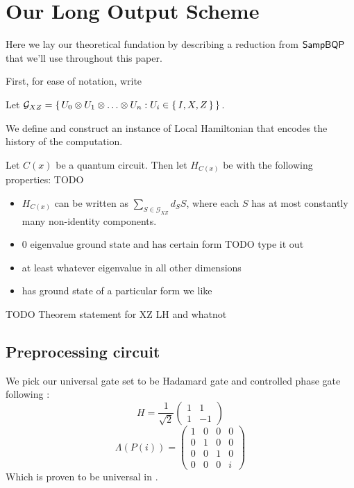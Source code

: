 \section{Our Long Output Scheme}

Here we lay our theoretical fundation by describing a reduction from $\operatorname{\mathsf{SampBQP}}$ that we'll use throughout this paper.

First, for ease of notation, write

\begin{definition}
	Let $\mathcal{G}_{XZ}=\set{U_0\otimes U_1\otimes\ldots\otimes U_n: U_i\in\set{I,X,Z}}$.
\end{definition}

We define and construct an instance of Local Hamiltonian that encodes the history of the computation.

\begin{definition}
	Let $C(x)$ be a quantum circuit. Then let $H_{C(x)}$ be with the following properties: TODO
	\begin{itemize}
		\item $H_{C(x)}$ can be written as $\sum_{S\in\mathcal{G}_{XZ}} d_S S$, where each $S$ has at most constantly many non-identity components.
		\item 0 eigenvalue ground state and has certain form TODO type it out
		\item at least whatever eigenvalue in all other dimensions
		\item has ground state of a particular form we like
	\end{itemize}
\end{definition}

TODO Theorem statement for XZ LH and whatnot

\subsection{Preprocessing circuit}

We pick our universal gate set to be Hadamard gate and controlled phase gate following \cite{quant-ph/0301040}:
$$H=\frac{1}{\sqrt{2}}\begin{pmatrix}1&1\\1&-1\end{pmatrix}$$
	$$\Lambda(P(i))=\begin{pmatrix}1&0&0&0\\0&1&0&0\\0&0&1&0\\0&0&0&i\end{pmatrix}$$
		Which is proven to be universal in \cite{kitaev_1997}.

